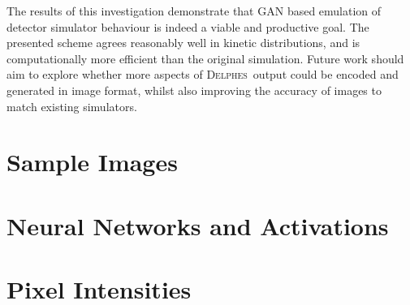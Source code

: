 \documentclass[twocolumn]{article}
\newcommand{\pkg}[1]{\textsc{#1}}
\newcommand{\delphes}{\pkg{Delphes}}
\begin{document}
The results of this investigation demonstrate that GAN based emulation of detector simulator behaviour is indeed a viable and productive goal. The presented scheme agrees reasonably well in kinetic distributions, and is computationally more efficient than the original simulation. Future work should aim to explore whether more aspects of \delphes~output could be encoded and generated in image format, whilst also improving the accuracy of images to match existing simulators. 
\onecolumn


\begin{appendices}
\section{Sample Images}

\section{Neural Networks and Activations}

\section{Pixel Intensities}
\end{appendices}

\printbibliography[title=References]
\end{document}

